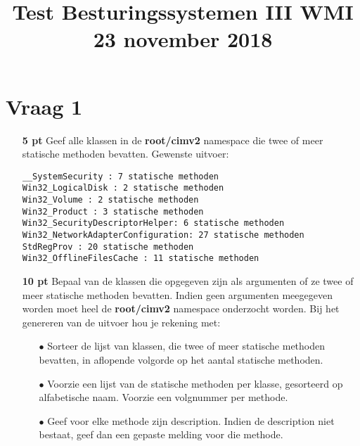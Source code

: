 \documentclass{article}
\begin{document}
\title{Test Besturingssystemen III WMI 23 november 2018}
\date{}
\author{}
\maketitle

\section*{Vraag 1} 
\begin{itemize}
    \item[\textbf{5 pt}] Geef alle klassen in de \textbf{root/cimv2} namespace die twee of meer statische methoden bevatten. Gewenste uitvoer:
        \begin{lstlisting}
__SystemSecurity : 7 statische methoden
Win32_LogicalDisk : 2 statische methoden
Win32_Volume : 2 statische methoden
Win32_Product : 3 statische methoden
Win32_SecurityDescriptorHelper: 6 statische methoden
Win32_NetworkAdapterConfiguration: 27 statische methoden
StdRegProv : 20 statische methoden
Win32_OfflineFilesCache : 11 statische methoden
        \end{lstlisting}
    \item[\textbf{10 pt}] Bepaal van de klassen die opgegeven zijn als argumenten of ze twee of meer statische methoden bevatten. Indien geen argumenten meegegeven worden moet heel de \textbf{root/cimv2} namespace onderzocht worden. Bij het genereren van de uitvoer hou je rekening met:
    \begin{itemize}
        \item[$\bullet$] Sorteer de lijst van klassen, die twee of meer statische methoden bevatten, in aflopende volgorde op het aantal statische methoden.
        \item[$\bullet$] Voorzie een lijst van de statische methoden per klasse, gesorteerd op alfabetische naam. Voorzie een volgnummer per methode.
        \item[$\bullet$] Geef voor elke methode zijn description. Indien de description niet bestaat, geef dan een gepaste melding voor die methode.
    \end{itemize}
\end{itemize}
\end{document}
